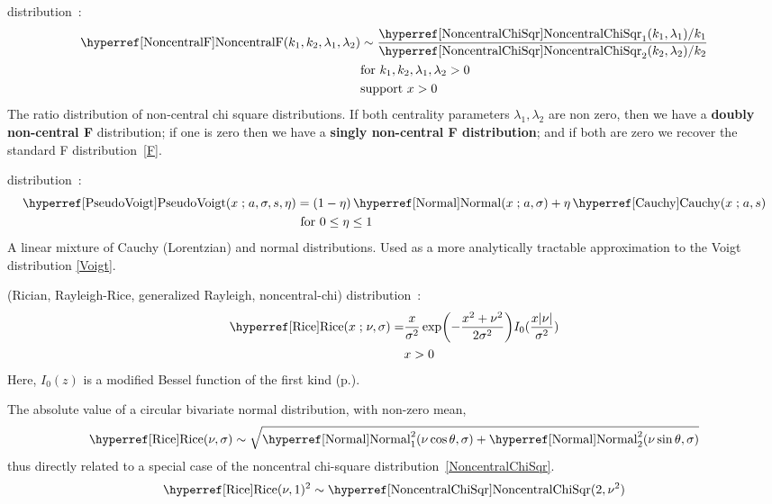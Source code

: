 \secbreak

 distribution~\cite{Fisher1928, Johnson1995}:
\begin{align}
\label{NoncentralF}
\opr{NoncentralF}(k_1,k_2,\lambda_1,\lambda_2) &\sim \frac{\opr{NoncentralChiSqr}_1(k_1,\lambda_1)/k_1 }{\opr{NoncentralChiSqr}_2(k_2,\lambda_2)/k_2 }
\checked
\notag
\\
& \text{for } k_1,k_2,\lambda_1,\lambda_2 > 0  \notag \\
& \text{support } x>0
\end{align}
The ratio distribution of non-central chi square distributions. If both centrality parameters $\lambda_1,\lambda_2$ are non zero, then we have a {\bf doubly non-central F} distribution; if one is zero then we have a {\bf singly non-central F distribution}; and if both are zero we recover the standard F distribution~\eqref{F}.




\secbreak
{} distribution~\cite{Wertheim1974}: 
\begin{align}
\label{PseudoVoigt}
\opr{PseudoVoigt}(x\given a,\sigma, s, \eta) &= (1-\eta) \opr{Normal}(x\given a,\sigma) + \eta \opr{Cauchy}(x\given a,s)
\notag \checked
\\
& \text{ for } 0\leq\eta\leq1
\end{align}
A linear mixture of Cauchy (Lorentzian) and normal distributions. Used as a more analytically tractable approximation to the Voigt distribution \eqref{Voigt}. 


\secbreak
 (Rician, Rayleigh-Rice, generalized Rayleigh, noncentral-chi) distribution~\cite{Rice1945,Talukdar1991}:
\begin{align}
\label{Rice}
\opr{Rice}(x\given \nu,\sigma) = & \frac{x}{\sigma^2} \exp\Left(-\frac{x^2+\nu^2 }{2\sigma^2}  \Right) I_0(\frac{x |\nu|}{\sigma^2})
\checked
\\ 
& x>0 \notag
\end{align}
Here, $I_0(z)$ is a modified Bessel function of the first kind (p.\pageref{ModBesselFirst}). 

The absolute value of a circular bivariate normal distribution, with non-zero mean,
\[
\opr{Rice}(\nu,\sigma) \sim \sqrt{\opr{Normal}^2_1(\nu \cos \theta,\sigma)  +\opr{Normal}^2_2(\nu \sin \theta,\sigma)   }
\checked \notag
\]
thus directly related to a special case of the noncentral chi-square distribution~\eqref{NoncentralChiSqr}. 
\[
\opr{Rice}(\nu,1)^2 \sim  \opr{NoncentralChiSqr}(2,\nu^2) \checked
\notag
\]



